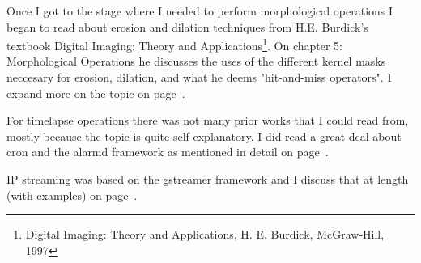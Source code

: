 Once I got to the stage where I needed to perform morphological operations I began to read about erosion and dilation techniques from H.E. Burdick's textbook Digital Imaging: Theory and Applications\footnote{Digital Imaging: Theory and Applications, H. E. Burdick, McGraw-Hill, 1997}\label{ref:digim}. On chapter 5: Morphological Operations he discusses the uses of the different kernel masks neccesary for erosion, dilation, and what he deems "hit-and-miss operators". I expand more on the topic on page~\pageref{kernelmorph}.

For timelapse operations there was not many prior works that I could read from, mostly because the topic is quite self-explanatory. I did read a great deal about cron and the alarmd framework as mentioned in detail on page~\pageref{cronalarm}.

IP streaming was based on the gstreamer framework and I discuss that at length (with examples) on page~\pageref{gstreamertalk}.

%
%
%